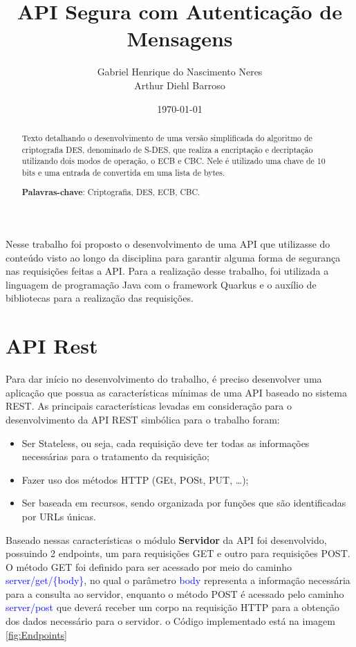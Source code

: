 \documentclass[12pt]{article}
\title{API Segura com Autenticação de Mensagens}
\author{Gabriel Henrique do Nascimento Neres \\ Arthur Diehl Barroso}
\date{\today}
\newcommand{\blue}[1]{\textcolor{blue}{#1}}
\begin{document}
\maketitle

\begin{abstract}
  Texto detalhando o desenvolvimento de uma versão simplificada do algoritmo de criptografia DES, denominado de S-DES, que realiza a encriptação e decriptação utilizando dois modos de operação, o ECB e CBC. Nele é utilizado uma chave de 10 bits e uma entrada de convertida em uma lista de bytes. 

  \textbf{Palavras-chave}: Criptografia, DES, ECB, CBC.
\end{abstract}

Nesse trabalho foi proposto o desenvolvimento de uma API que utilizasse do conteúdo visto ao longo da disciplina para garantir alguma forma de segurança nas requisições feitas a API. Para a realização desse trabalho, foi utilizada a linguagem de programação Java com o framework Quarkus e o auxílio de bibliotecas para a realização das requisições.

\section{API Rest}
Para dar início no desenvolvimento do trabalho, é preciso desenvolver uma aplicação que possua as características mínimas de uma API baseado no sistema REST. As principais características levadas em consideração para o desenvolvimento da API REST simbólica para o trabalho foram:

\begin{itemize}
  \item Ser Stateless, ou seja, cada requisição deve ter todas as informações necessárias para o tratamento da requisição;
  \item Fazer uso dos métodos HTTP (GEt, POSt, PUT, \dots);
  \item Ser baseada em recursos, sendo organizada por funções que são identificadas por URLs únicas.
\end{itemize}

Baseado nessas características o módulo \textbf{Servidor} da API foi desenvolvido, possuindo 2 endpoints, um para requisições GET e outro para requisições POST. O método GET foi definido para ser acessado por meio do caminho \blue{server/get/\{body\}}, no qual o parâmetro \blue{body} representa a informação necessária para a consulta ao servidor, enquanto o método POST é acessado pelo caminho \blue{server/post} que deverá receber um corpo na requisição HTTP para a obtenção dos dados necessário para o servidor. o Código implementado está na imagem \ref{fig:Endpoints}
\end{document}
